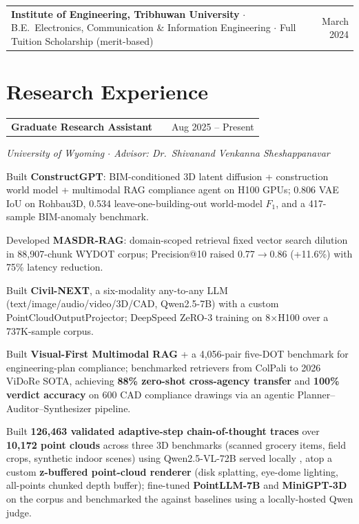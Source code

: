 \documentclass[a4paper,10pt]{article}
\makeatletter
\newcommand{\gh}[1]{\,\href{https://github.com/Nabarajsub/#1}{\faGithub}}
\newenvironment{jobshort}[2]
    {
    \begin{tabularx}{\linewidth}{@{}l X r@{}}
    \textbf{#1} & \hfill & #2 \\[1.5pt]
    \end{tabularx}
    }
    {}
\makeatother
\begin{document}
\vspace{4pt}
\begin{tabularx}{\linewidth}{@{}X r@{}}
\textbf{Institute of Engineering, Tribhuwan University} $\cdot$ B.E.\ Electronics, Communication \& Information Engineering $\cdot$ Full Tuition Scholarship (merit-based) & March 2024 
\end{tabularx}


\section{Research Experience}

\begin{jobshort}{Graduate Research Assistant }{Aug 2025 -- Present}
\textit{ University of Wyoming $\cdot$ Advisor: Dr.\ Shivanand Venkanna Sheshappanavar}
\begin{itemize}[itemsep=-5pt]
{
    \item Built \textbf{ConstructGPT}: BIM-conditioned 3D latent diffusion +
  construction world model + multimodal RAG compliance agent on H100 GPUs;
  0.806 VAE IoU on Rohbau3D, 0.534 leave-one-building-out world-model $F_1$,
  and a 417-sample BIM-anomaly benchmark.
    \item Developed \textbf{MASDR-RAG}: domain-scoped retrieval fixed vector search dilution in 88,907-chunk WYDOT corpus; Precision@10 raised 0.77$\to$0.86 (+11.6\%) with 75\% latency reduction.\gh{masdr-rag}
    \item Built \textbf{Civil-NEXT}, a six-modality any-to-any LLM (text/image/audio/video/3D/CAD, Qwen2.5-7B) with a custom PointCloudOutputProjector; DeepSpeed ZeRO-3 training on 8$\times$H100 over a 737K-sample corpus.
    \item Built \textbf{Visual-First Multimodal RAG} + a 4{,}056-pair five-DOT benchmark for engineering-plan
  compliance; benchmarked retrievers from ColPali to 2026 ViDoRe SOTA, achieving \textbf{88\% zero-shot
  cross-agency transfer} and \textbf{100\% verdict accuracy} on 600 CAD compliance drawings via an agentic
  Planner--Auditor--Synthesizer pipeline.\gh{plansightrag}
    \item Built \textbf{126{,}463 validated adaptive-step chain-of-thought traces} over \textbf{10{,}172 point clouds} across three 3D benchmarks (scanned grocery items, field crops, synthetic indoor scenes) using Qwen2.5-VL-72B served locally , atop a  custom \textbf{z-buffered point-cloud renderer} (disk splatting, eye-dome lighting, all-points chunked depth buffer); fine-tuned \textbf{PointLLM-7B} and \textbf{MiniGPT-3D} on the corpus and benchmarked the against baselines using a locally-hosted Qwen judge.
}
\end{itemize}
\end{jobshort}
\end{document}
